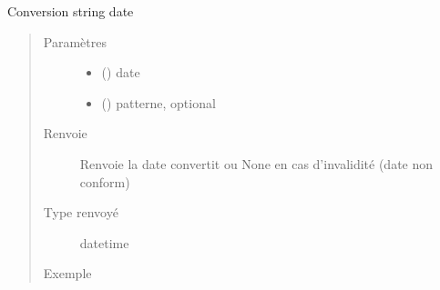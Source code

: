 \documentclass[letterpaper,10pt,french]{sphinxmanual}
\begin{document}
\begin{fulllineitems}
\label{\detokenize{modules/dtemng:toolbox.dtemng.strdate}}
Conversion string \sphinxhyphen{} date
\begin{quote}\begin{description}
\item[{Paramètres}] \leavevmode\begin{itemize}
\item {} 
 () \textendash{} date

\item {} 
\sphinxstyleliteralstrong{\sphinxupquote{, }} () \textendash{} patterne, optional

\end{itemize}

\item[{Renvoie}] \leavevmode
Renvoie la date convertit ou None en cas d’invalidité (date non conform)

\item[{Type renvoyé}] \leavevmode
datetime

\item[{Exemple}] \leavevmode
\begin{sphinxVerbatim}[commandchars=\\\{\}]
  
  
\end{sphinxVerbatim}

\end{description}\end{quote}

\end{fulllineitems}
\end{document}
